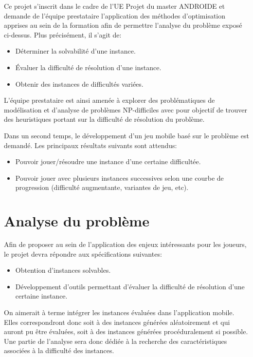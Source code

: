 \documentclass[a4paper, 11pt, titlepage, oneside]{report}
\begin{document}
	Ce projet s’inscrit dans le cadre de l’UE Projet du master ANDROIDE et demande de l’équipe prestataire l’application des méthodes d’optimisation apprises au sein de la formation afin de permettre l’analyse du problème exposé ci-dessus. Plus précisément, il s’agit de:
	\begin{itemize}
		\item Déterminer la solvabilité d’une instance.
		\item Évaluer la difficulté de résolution d’une instance.
		\item Obtenir des instances de difficultés variées.
	\end{itemize}
L’équipe prestataire est ainsi amenée à explorer des problématiques de modélisation et d’analyse de problèmes NP-difficiles avec pour objectif de trouver des heuristiques portant sur la difficulté de résolution du problème.

Dans un second temps, le développement d’un jeu mobile basé sur le problème est demandé. Les principaux résultats suivants sont attendus:
\begin{itemize}
	\item Pouvoir jouer/résoudre une instance d’une certaine difficultée.
	\item Pouvoir jouer avec plusieurs instances successives selon une courbe de progression (difficulté augmentante, variantes de jeu, etc).
\end{itemize}

	\section{Analyse du problème}
	
	Afin de proposer au sein de l’application des enjeux intéressants pour les joueurs, le projet devra répondre aux spécifications suivantes:
	\begin{itemize}
		\item Obtention d’instances solvables. 
		\item Développement d’outils permettant d’évaluer la difficulté de résolution d’une certaine instance. 
	\end{itemize}
On aimerait à terme intégrer les instances évaluées dans l’application mobile. Elles correspondront donc soit à des instances générées aléatoirement et qui auront pu être évaluées, soit à des instances générées procéduralement si possible. Une partie de l’analyse sera donc dédiée à la recherche des caractéristiques associées à la difficulté des instances.
\end{document}
